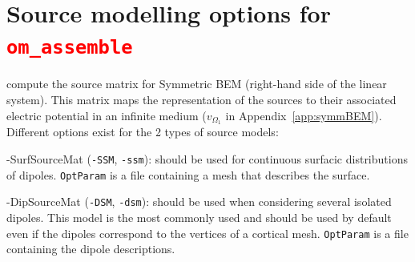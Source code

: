 \documentclass[10pt,journal]{book}
\newcommand{\commandName}[1]{\textcolor{red}{\tt #1}}
\newcommand{\optionName}[1]{\textcolor{OliveGreen}{\tt #1}}
\newenvironment{Options}{
    \begin{list}{}{
        \let\makelabel\OptionsLabel\setlength\labelwidth{30pt}%
        \setlength\leftmargin{\labelwidth+\labelsep}}}
    {\end{list}}
\newcommand*\OptionsLabel[1]{\optionName{#1}}
\begin{document}
        \section{Source modelling options for \commandName{om\_assemble}} compute the source matrix for Symmetric BEM (right-hand side of the linear system).
            This matrix maps the representation of the sources to their associated electric potential in an infinite medium ($v_{\Omega_1}$ in
            Appendix~\ref{app:symmBEM}).  Different options exist for the 2 types of source models:
            \begin{Options}
                \item[-SurfSourceMat] (\optionName{-SSM}, \optionName{-ssm}): should be used for continuous surfacic distributions of dipoles.
                        \optionName{OptParam} is a file containing a mesh that describes the surface.
                \item[-DipSourceMat] (\optionName{-DSM}, \optionName{-dsm}): should be used when considering several isolated dipoles. This model is the most commonly used and should be used by default even if the dipoles correspond to the vertices of a cortical mesh.
                        \optionName{OptParam} is a file containing the dipole descriptions.

            \end{Options}
\end{document}
